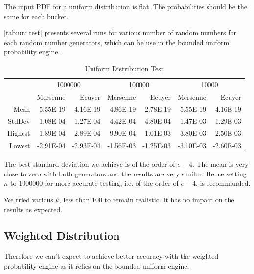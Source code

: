 \documentclass[12pt,a4paper,article]{memoir} %
\begin{document}
The input PDF for a uniform distribution is flat. The probabilities
should be the same for each bucket. 

\autoref{tab:uni.test} presents several runs for various number of random
numbers for each random number generators, which can be use in
the bounded uniform probability engine.
\begin{table}[htbp!]
  \centering \tiny
    \begin{tabular}{r|rrrrrr}
    \multicolumn{1}{r}{} & \multicolumn{2}{c}{1000000} & \multicolumn{2}{c}{100000} & \multicolumn{2}{c}{10000} \\
    \multicolumn{1}{r}{} & Mersenne & Ecuyer & Mersenne & Ecuyer & Mersenne & Ecuyer \\
\cmidrule{2-7}    Mean  & 5.55E-19 & 4.16E-19 & 4.86E-19 & 2.78E-19 & 5.55E-19 & 4.16E-19 \\
    StdDev  & 1.08E-04 & 1.27E-04 & 4.42E-04 & 4.80E-04 & 1.47E-03 & 1.29E-03 \\
    Highest  & 1.89E-04 & 2.89E-04 & 9.90E-04 & 1.01E-03 & 3.80E-03 & 2.50E-03 \\
    Lowest  & -2.91E-04 & -2.93E-04 & -1.56E-03 & -1.25E-03 & -3.10E-03 & -2.60E-03 \\
    \end{tabular}%
  \caption{Uniform Distribution Test}
  \label{tab:uni.test}%
\end{table}%

The best standard deviation we achieve is of the order of $e-4$.
The mean is very close to zero with both generators and the results 
are very similar.
Hence setting $n$ to 1000000 for more accurate testing, 
i.e. of the order of $e-4$, is recommanded.

We tried various $k$, less than 100 to remain realistic. It has no impact on the
results as expected.

\subsection{Weighted Distribution}

Therefore we can't expect to achieve better accuracy with the
weighted probability engine as it relies on the bounded uniform engine.
\end{document}
